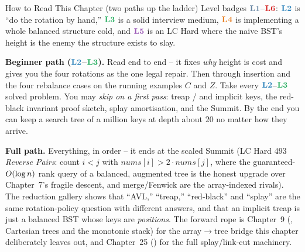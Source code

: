 \begin{chaptertheorybox}{How to Read This Chapter (two paths up the ladder)}
Level badges $\lv1$--$\lv6$: $\lv2$ is ``do the rotation by hand,'' $\lv3$ is a solid interview
medium, $\lv4$ is implementing a whole balanced structure cold, and $\lv5$ is an LC Hard where the
naive BST's height is the enemy the structure exists to slay.

\textbf{Beginner path ($\lv2$--$\lv3$).} Read  end to end -- it fixes \emph{why}
height is cost and gives you the four rotations as the one legal repair. Then  through
insertion and the four rebalance cases on the running examples $C$ and $Z$. Take every
$\lv2$--$\lv{3}$ solved problem. You may \emph{skip on a first pass}: treap /
and implicit keys, the red-black invariant proof sketch, splay amortisation, and the Summit. By the
end you can keep a search tree of a million keys at depth about $20$ no matter how they arrive.

\textbf{Full path.} Everything, in order -- it ends at the scaled Summit (LC Hard 493 \emph{Reverse
Pairs}: count $i<j$ with $\mathit{nums}[i]>2\cdot\mathit{nums}[j]$, where the guaranteed-$O(\log
n)$ rank query of a balanced, augmented tree is the honest upgrade over Chapter~7's fragile descent,
and merge/Fenwick are the array-indexed rivals). The reduction gallery shows that ``AVL,'' ``treap,''
``red-black'' and ``splay'' are the same rotation-policy question with different answers, and that an
implicit treap is just a balanced BST whose keys are \emph{positions}. The forward rope is Chapter~9
(, Cartesian trees and the monotonic stack) for the array$\to$tree bridge this chapter
deliberately leaves out, and Chapter~25 () for the full splay/link-cut machinery.
\end{chaptertheorybox}

